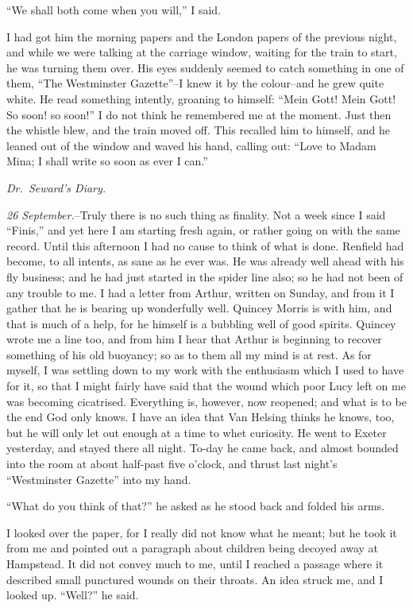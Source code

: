 \documentclass[12pt,openright]{book}
\begin{document}
“We shall both come when you will,” I said.

I had got him the morning papers and the London papers of the previous night, and while we were talking at the carriage window, waiting for the train to start, he was turning them over. His eyes suddenly seemed to catch something in one of them, “The Westminster Gazette”–I knew it by the colour–and he grew quite white. He read something intently, groaning to himself: “Mein Gott! Mein Gott! So soon! so soon!” I do not think he remembered me at the moment. Just then the whistle blew, and the train moved off. This recalled him to himself, and he leaned out of the window and waved his hand, calling out: “Love to Madam Mina; I shall write so soon as ever I can.”

\textit{Dr. Seward’s Diary.}

\textit{26 September.}–Truly there is no such thing as finality. Not a week since I said “Finis,” and yet here I am starting fresh again, or rather going on with the same record. Until this afternoon I had no cause to think of what is done. Renfield had become, to all intents, as sane as he ever was. He was already well ahead with his fly business; and he had just started in the spider line also; so he had not been of any trouble to me. I had a letter from Arthur, written on Sunday, and from it I gather that he is bearing up wonderfully well. Quincey Morris is with him, and that is much of a help, for he himself is a bubbling well of good spirits. Quincey wrote me a line too, and from him I hear that Arthur is beginning to recover something of his old buoyancy; so as to them all my mind is at rest. As for myself, I was settling down to my work with the enthusiasm which I used to have for it, so that I might fairly have said that the wound which poor Lucy left on me was becoming cicatrised. Everything is, however, now reopened; and what is to be the end God only knows. I have an idea that Van Helsing thinks he knows, too, but he will only let out enough at a time to whet curiosity. He went to Exeter yesterday, and stayed there all night. To-day he came back, and almost bounded into the room at about half-past five o’clock, and thrust last night’s “Westminster Gazette” into my hand.

“What do you think of that?” he asked as he stood back and folded his arms.

I looked over the paper, for I really did not know what he meant; but he took it from me and pointed out a paragraph about children being decoyed away at Hampstead. It did not convey much to me, until I reached a passage where it described small punctured wounds on their throats. An idea struck me, and I looked up. “Well?” he said.
\end{document}
